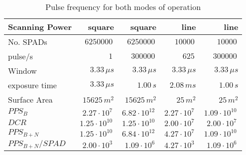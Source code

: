 \begin{table}[H]
\centering
\caption{Pulse frequency for both modes of operation}
\label{tab:scanning_power}
\begin{tabular}{|l|rrrr|}\hline
    \textbf{Scanning Power} & square & square & line & line \\
    \hline 
    No. SPADs & $6250000\,$ & $6250000\,$ & $10000\,$ & $10000\,$ \\
    pulse/s & $1\,$ & $300000\,$ & $625\,$ & $300000\,$ \\
    Window & $3.33\,\mu s$ & $3.33\,\mu s$ & $3.33\,\mu s$ & $3.33\,\mu s$ \\
    exposure time & $3.33\,\mu s$ & $1.00\, s$ & $2.08\,m s$ & $1.00\, s$ \\
    Surface Area & $15625\,m^2$ & $15625\,m^2$ & $25\,m^2$ & $25\,m^2$ \\
    $PPS_B$ & $2.27\cdot10^{7}\,$ & $6.82\cdot10^{12}\,$ & $2.27\cdot10^{7}\,$ & $1.09\cdot10^{10}\,$ \\
    $DCR$ & $1.25\cdot10^{10}\,$ & $1.25\cdot10^{10}\,$ & $2.00\cdot10^{7}\,$ & $2.00\cdot10^{7}\,$ \\
    $PPS_{B+N}$ & $1.25\cdot10^{10}\,$ & $6.84\cdot10^{12}\,$ & $4.27\cdot10^{7}\,$ & $1.09\cdot10^{10}\,$ \\
    $PPS_{B+N}/SPAD$ & $2.00\cdot10^{3}\,$ & $1.09\cdot10^{6}\,$ & $4.27\cdot10^{3}\,$ & $1.09\cdot10^{6}\,$ \\
    \hline 
\end{tabular}
\end{table}
